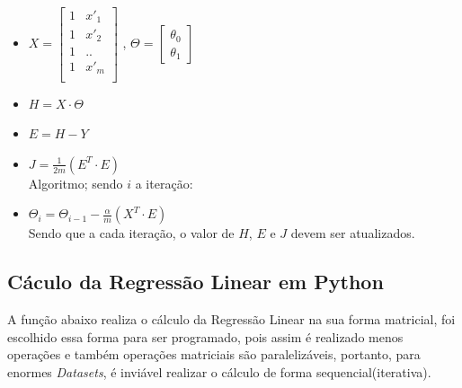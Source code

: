 \documentclass[a4paper, 12pt]{article}
\begin{document}
\begin{itemize}
    \item $X=\begin{bmatrix}
        1 & x'_1 \\
        1 & x'_2 \\
        1 & .. \\
        1 & x'_m \\
    \end{bmatrix}$ ,
    $\Theta=\begin{bmatrix}
        \theta_0\\
        \theta_1
    \end{bmatrix}$
    \item $H=X \cdot \Theta$
    \item $E=H - Y $
    \item $J=\frac{1}{2m}(E^T \cdot E)$ \\
    
    Algoritmo; sendo $i$ a iteração:
    \item $\Theta_i=\Theta_{i-1} - \frac{\alpha}{m}(X^T \cdot E)$\\
    
    Sendo que a cada iteração, o valor de $H$, $E$ e $J$ devem ser atualizados.
    
\end{itemize}
\clearpage

\subsection{Cáculo da Regressão Linear em Python}
A função abaixo realiza o cálculo da Regressão Linear na sua forma matricial, foi escolhido essa forma
para ser programado, pois assim é realizado menos operações e também operações matriciais são paralelizáveis,
portanto, para enormes \textit{Datasets}, é inviável realizar o cálculo de forma sequencial(iterativa).
\end{document}
